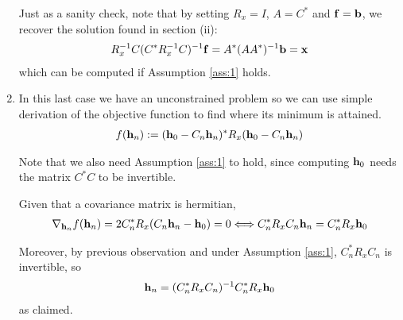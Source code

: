 \documentclass{article}
\begin{document}
\begin{enumerate}[label=(\roman*)]
        Just as a sanity check, note that by setting $R_x = I$, $A = C^*$ and $\mathbf{f} = \mathbf{b}$, we recover the solution found in section (ii):
        \begin{align}
            R_x^{-1} C (C^* R_x^{-1} C)^{-1} \mathbf{f} = A^* (A A^*)^{-1} \mathbf{b} = \mathbf{x}
        \end{align}
        which can be computed if Assumption \ref{ass:1} holds.
        
        \item In this last case we have an unconstrained problem so we can use simple derivation of the objective function to find where its minimum is attained.
        \begin{align}
            f(\mathbf{h}_n) := (\mathbf{h}_0 - C_n \mathbf{h}_n )^* R_x (\mathbf{h}_0 - C_n \mathbf{h}_n )
        \end{align}
        
        Note that we also need Assumption \ref{ass:1} to hold, since computing $\mathbf{h}_0$ needs the matrix $C^* C$ to be invertible.
        
        Given that a covariance matrix is hermitian,
        \begin{align}
            \nabla_{\mathbf{h}_n} f(\mathbf{h}_n) = 2 C_n^* R_x (C_n \mathbf{h}_n - \mathbf{h}_0) = 0 \Longleftrightarrow C_n^* R_x C_n \mathbf{h}_n =  C_n^* R_x \mathbf{h}_0
        \end{align}
        
        Moreover, by previous observation and under Assumption \ref{ass:1}, $C_n^* R_x C_n$ is invertible, so
        \begin{align}
            \mathbf{h}_n = (C_n^* R_x C_n)^{-1} C_n^* R_x \mathbf{h}_0
        \end{align}
        as claimed.
    \end{enumerate}
\end{document}
